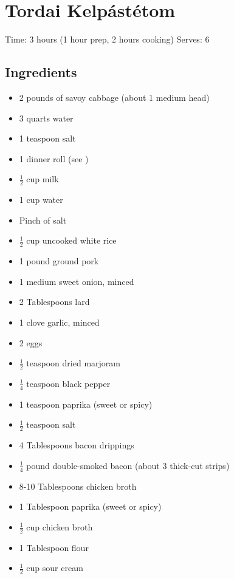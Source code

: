 \section{Tordai Kelpástétom}
\label{tordaiKelpastetom}
\setcounter{secnumdepth}{0}
Time: 3 hours (1 hour prep, 2 hours cooking)
Serves: 6

\begin{multicols}{2}
\subsection*{Ingredients}
\begin{itemize}
    \item 2 pounds of savoy cabbage (about 1 medium head)
    \item 3 quarts water
    \item 1 teaspoon salt
    \item 1 dinner roll (see )
    \item \( \frac{1}{2} \) cup milk
    \item 1 cup water
    \item Pinch of salt
    \item \( \frac{1}{2} \) cup uncooked white rice
    \item 1 pound ground pork
    \item 1 medium sweet onion, minced
    \item 2 Tablespoons lard
    \item 1 clove garlic, minced
    \item 2 eggs
    \item \( \frac{1}{2} \) teaspoon dried marjoram
    \item \( \frac{1}{4} \) teaspoon black pepper
    \item 1 teaspoon paprika (sweet or spicy)
    \item \( \frac{1}{2} \) teaspoon salt
    \item 4 Tablespoons bacon drippings
    \item \( \frac{1}{4} \) pound double-smoked bacon (about 3 thick-cut strips)
    \item 8-10 Tablespoons chicken broth
    \item 1 Tablespoon paprika (sweet or spicy)
    \item \( \frac{1}{2} \) cup chicken broth
    \item 1 Tablespoon flour
    \item \( \frac{1}{2} \) cup sour cream
\end{itemize}


\end{multicols}
